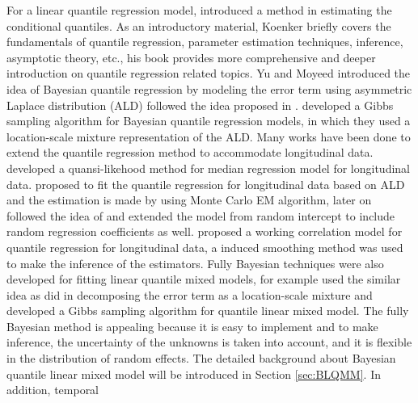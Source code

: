 \documentclass{article}
\begin{document}
For a linear quantile regression model, \cite{koenker1978regression} introduced a method in estimating the conditional quantiles. As an introductory material, Koenker \cite{koenker2001quantile} briefly covers the fundamentals of quantile regression, parameter estimation techniques, inference, asymptotic theory, etc., his book \cite{koenker2005quantile} provides more comprehensive and deeper introduction on quantile regression related topics.  Yu and Moyeed \cite{yu2001bayesian} introduced the idea of Bayesian quantile regression by modeling the error term using asymmetric Laplace distribution (ALD) followed the idea proposed in \cite{koenker1978regression}. \cite{kozumi2011gibbs} developed a Gibbs sampling algorithm for Bayesian quantile regression models, in which they used a location-scale mixture representation of the ALD. Many works have been done to extend the quantile regression method to accommodate longitudinal data. \cite{jung1996quasi} developed a quansi-likehood method for median regression model for longitudinal data. \cite{geraci2007quantile} proposed to fit the quantile regression for longitudinal data based on ALD and the estimation is made by using Monte Carlo EM algorithm, later on \cite{liu2009mixed} followed the idea of \cite{geraci2007quantile} and extended the model from random intercept to include random regression coefficients as well. \cite{fu2012quantile} proposed  a working correlation model for quantile regression for longitudinal data, a induced smoothing method was used to make the inference of the estimators. Fully Bayesian techniques were also developed for fitting linear quantile mixed models, for example \cite{luo2012bayesian} used the similar idea as \cite{kozumi2011gibbs} did in decomposing the error term as a location-scale mixture and developed a Gibbs sampling algorithm for quantile linear mixed model. The fully Bayesian method is appealing because it is easy to implement and to make inference, the uncertainty of the unknowns is taken into account, and it is flexible in the distribution of random effects. The detailed background about Bayesian quantile linear mixed model will be introduced in Section \ref{sec:BLQMM}. In addition, temporal\par
\end{document}
